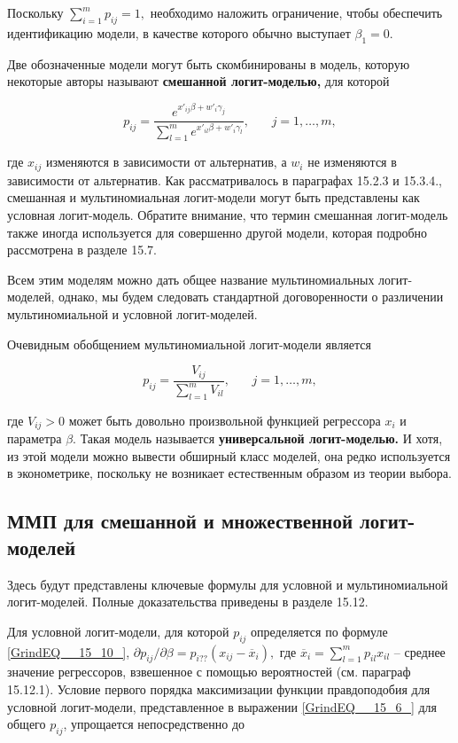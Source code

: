 Поскольку $\sum^m_{i=1}{p_{ij}}=1,$ необходимо наложить ограничение,  чтобы обеспечить идентификацию модели, в качестве которого обычно выступает ${\beta }_1=0.$

Две обозначенные модели могут быть скомбинированы в модель, которую некоторые авторы называют \textbf{смешанной логит-моделью, }для которой

\begin{equation} \label{GrindEQ__15_12_} p_{ij}=\frac{e^{x'_{ij}\beta +w'_i{\gamma }_j}}{\sum^m_{l=1}{e^{x'_{il}\beta +w'_i{\gamma }_l}}},\ \ \ \ \ \ \ \ j=1,\dots ,m, \end{equation} 

где $x_{ij}$ изменяются в зависимости от альтернатив, а $w_i$ не изменяются в зависимости от альтернатив. Как рассматривалось в параграфах 15.2.3 и 15.3.4., смешанная и мультиномиальная логит-модели могут быть представлены как условная логит-модель. Обратите внимание, что термин смешанная логит-модель также иногда используется для совершенно другой модели, которая подробно рассмотрена в разделе 15.7.

Всем этим моделям можно дать общее название мультиномиальных логит-моделей, однако, мы будем следовать стандартной договоренности о различении мультиномиальной и условной логит-моделей.

Очевидным обобщением мультиномиальной логит-модели является

\begin{equation} \label{GrindEQ__15_13_} p_{ij}=\frac{V_{ij}}{\sum^m_{l=1}{V_{il}}},\ \ \ \ \ \ \ \ j=1,\dots ,m, \end{equation} 

где $V_{ij}>0$ может быть довольно произвольной функцией регрессора $x_i$ и параметра $\beta $. Такая модель называется \textbf{универсальной логит-моделью.} И хотя, из этой модели можно вывести обширный класс моделей, она редко используется в эконометрике, поскольку не возникает естественным образом из теории выбора.

\subsection{ММП для смешанной и множественной логит-моделей}

Здесь будут представлены ключевые формулы для условной и мультиномиальной логит-моделей. Полные доказательства приведены в разделе 15.12.

Для условной логит-модели, для которой $p_{ij}$ определяется по формуле \eqref{GrindEQ__15_10_}, ${\partial p_{ij}}/{\partial \beta }=p_{i??}\left(x_{ij}-{\overline{x}}_i\right),$  где ${\overline{x}}_i=\sum^m_{l=1}{p_{il}x_{il}}$ -- среднее значение регрессоров, взвешенное с помощью вероятностей (см. параграф 15.12.1). Условие первого порядка максимизации функции правдоподобия для условной логит-модели, представленное в выражении \eqref{GrindEQ__15_6_} для общего $p_{ij}$, упрощается непосредственно до

